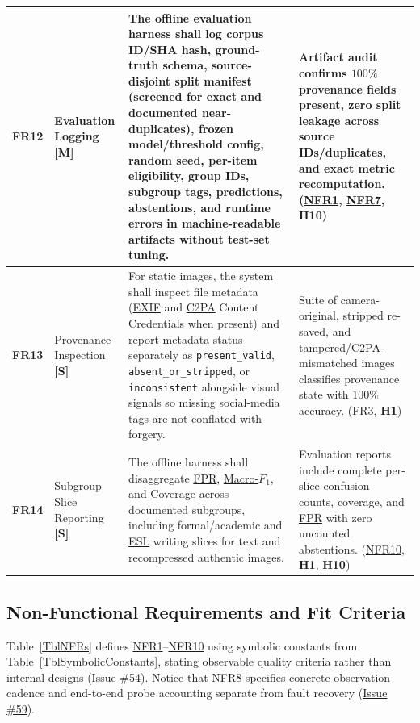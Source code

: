 \documentclass[11pt]{article}
\newcommand{\CTwoPA}{\hyperlink{acr-c2pa}{C2PA}}
\newcommand{\ESL}{\hyperlink{acr-esl}{ESL}}
\newcommand{\EXIF}{\hyperlink{acr-exif}{EXIF}}
\newcommand{\FPR}{\hyperlink{acr-fpr}{FPR}}
\newcommand{\TermMacroFOne}{\hyperlink{gls-macrof1}{Macro-$F_1$}}
\newcommand{\TermCoverage}{\hyperlink{gls-coverage}{Coverage}}
\begin{document}
{\begin{tabularx}{\textwidth}{P{1.1cm} P{2.25cm} Y Q{3.85cm}}
\label{FR12}\textbf{FR12} & Evaluation Logging \textbf{[M]} &
The offline evaluation harness shall log corpus ID/SHA hash, ground-truth schema, source-disjoint split manifest (screened for exact and documented near-duplicates), frozen model/threshold config, random seed, per-item eligibility, group IDs, subgroup tags, predictions, abstentions, and runtime errors in machine-readable artifacts without test-set tuning. &
Artifact audit confirms $100\%$ provenance fields present, zero split leakage across source IDs/duplicates, and exact metric recomputation. (\hyperref[NFR1]{NFR1}, \hyperref[NFR7]{NFR7}, \textbf{H10})\\
\midrule

\label{FR13}\textbf{FR13} & Provenance Inspection \textbf{[S]} &
For static images, the system shall inspect file metadata (\EXIF{} and \CTwoPA{} Content Credentials when present) and report metadata status separately as \texttt{present\_\allowbreak{}valid}, \texttt{absent\_\allowbreak{}or\_\allowbreak{}stripped}, or \texttt{inconsistent} alongside visual signals so missing social-media tags are not conflated with forgery. &
Suite of camera-original, stripped re-saved, and tampered/\CTwoPA{}-mismatched images classifies provenance state with $100\%$ accuracy. (\hyperref[FR3]{FR3}, \textbf{H1})\\
\midrule

\label{FR14}\textbf{FR14} & Subgroup Slice Reporting \textbf{[S]} &
The offline harness shall disaggregate \FPR{}, \TermMacroFOne{}, and \TermCoverage{} across documented subgroups, including formal/academic and \ESL{} writing slices for text and recompressed authentic images. &
Evaluation reports include complete per-slice confusion counts, coverage, and \FPR{} with zero uncounted abstentions. (\hyperref[NFR10]{NFR10}, \textbf{H1}, \textbf{H10})\\
\end{tabularx}
}

\subsection{Non-Functional Requirements and Fit Criteria}\label{subsec:nfr-reqs}

Table~\ref{TblNFRs} defines \hyperref[NFR1]{NFR1}--\hyperref[NFR10]{NFR10} using symbolic constants from Table~\ref{TblSymbolicConstants}, stating observable quality criteria rather than internal designs (\href{https://github.com/richy1337/Verity/issues/54}{Issue \#54}). Notice that \hyperref[NFR8]{NFR8} specifies concrete observation cadence and end-to-end probe accounting separate from fault recovery (\href{https://github.com/richy1337/Verity/issues/59}{Issue \#59}).
\end{document}
